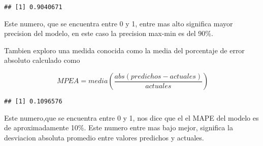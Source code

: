 \documentclass[]{book}
\begin{document}
\begin{verbatim}
## [1] 0.9040671
\end{verbatim}

Este numero, que se encuentra entre 0 y 1, entre mas alto significa
mayor precision del modelo, en este caso la precision max-min es del
90\%.

Tambien exploro una medida conocida como la media del porcentaje de
error absoluto calculado como

\[ \ MPEA = media(\frac{abs(predichos-actuales)}{actuales}) \]

\begin{verbatim}
## [1] 0.1096576
\end{verbatim}

Este numero,que se encuentra entre 0 y 1, nos dice que el el MAPE del
modelo es de aproximadamente 10\%. Este numero entre mas bajo mejor,
significa la desviacion absoluta promedio entre valores predichos y
actuales.

\citep{Wooldridge2002} \citep{Editors2009} \citep{Champernowne1972}
\citep{Learning} \citep{Farnsworth2008}


\end{document}
